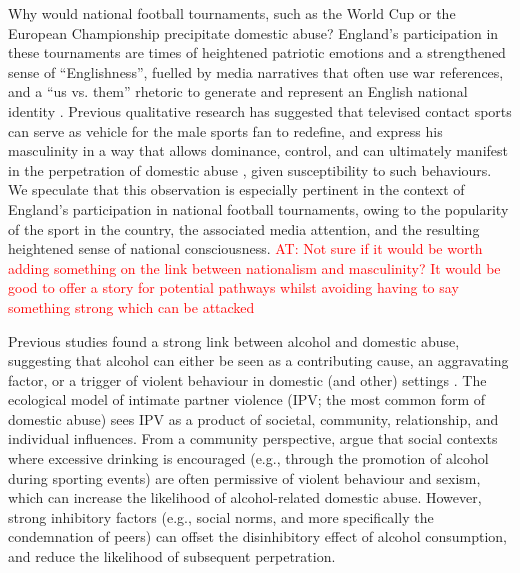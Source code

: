 \documentclass[12pt, a4paper]{article}
\newcommand{\AT}[1]{\textcolor{red}{AT: #1}}
\begin{document}
Why would national football tournaments, such as the World Cup or the European Championship precipitate domestic abuse? England's participation in these tournaments are times of heightened patriotic emotions and a strengthened sense of ``Englishness'', fuelled by media narratives that often use war references, and a ``us vs. them'' rhetoric to generate and represent an English national identity \cite{Vincent2014}. Previous qualitative research has suggested that televised contact sports can serve as vehicle for the male sports fan to redefine, and express his masculinity in a way that allows dominance, control, and can ultimately manifest in the perpetration of domestic abuse \cite{Sabo,Swallow}, given susceptibility to such behaviours. We speculate that this observation is especially pertinent in the context of England's participation in national football tournaments, owing to the popularity of the sport in the country, the associated media attention, and the resulting heightened sense of national consciousness. \AT{Not sure if it would be worth adding something on the link between nationalism and masculinity? It would be good to offer a story for potential pathways whilst avoiding having to say something strong which can be attacked}


Previous studies found a strong link between alcohol and domestic abuse, suggesting that alcohol can either be seen as a contributing cause, an aggravating factor, or a trigger of violent behaviour in domestic (and other) settings \cite{Leonard2017}. The ecological model of intimate partner violence (IPV; the most common form of domestic abuse) sees IPV as a product of societal, community, relationship, and individual influences. From a community perspective,  argue that social contexts where excessive drinking is encouraged (e.g., through the promotion of alcohol during sporting events) are often permissive of violent behaviour and sexism, which can increase the likelihood of alcohol-related domestic abuse. However, strong inhibitory factors (e.g., social norms, and more specifically the condemnation of peers) can offset the disinhibitory effect of alcohol consumption, and reduce the likelihood of subsequent perpetration.  

\end{document}
